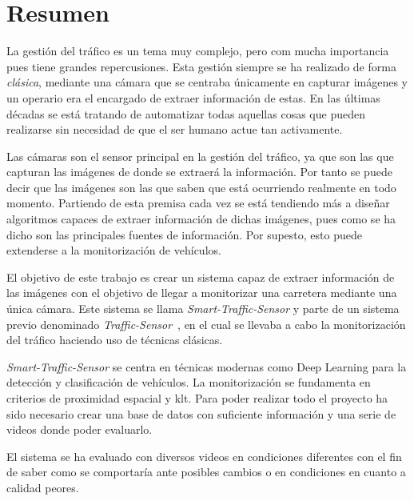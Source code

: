 \chapter*{Resumen}

La gestión del tráfico es un tema muy complejo, pero com mucha importancia pues tiene grandes repercusiones. Esta gestión siempre se ha realizado de forma \textit{clásica}, mediante una cámara que se centraba únicamente en capturar imágenes y un operario era el encargado de extraer información de estas. En las últimas décadas se está tratando de automatizar todas aquellas cosas que pueden realizarse sin necesidad de que el ser humano actue tan activamente.

Las cámaras son el sensor principal en la gestión del tráfico, ya que son las que capturan las imágenes de donde se extraerá la información. Por tanto se puede decir que las imágenes son las que saben que está ocurriendo realmente en todo momento. Partiendo de esta premisa cada  vez se está tendiendo más a diseñar algoritmos capaces de extraer información de dichas imágenes, pues como se ha dicho son las principales fuentes de información. Por supesto, esto puede extenderse a la monitorización de vehículos.

El objetivo de este trabajo es crear un sistema capaz de extraer información de las imágenes con el objetivo de llegar a monitorizar una carretera mediante una única cámara. Este sistema se llama \textit{Smart-Traffic-Sensor} y parte de un sistema previo denominado \textit{Traffic-Sensor}~\cite{traffic_monitor_redo}, en el cual se llevaba a cabo la monitorización del tráfico haciendo uso de técnicas clásicas.

\textit{Smart-Traffic-Sensor} se centra en técnicas modernas como Deep Learning para la detección y clasificación de vehículos. La monitorización se fundamenta en criterios  de  proximidad  espacial  y \acrfull{klt}. Para poder realizar todo el proyecto ha sido necesario crear una base de datos con suficiente información y una serie de videos donde poder evaluarlo.

El sistema se ha evaluado con diversos videos en condiciones diferentes con el fin de saber como se comportaría ante posibles cambios o en condiciones en cuanto a calidad peores.




